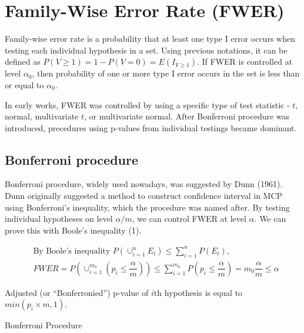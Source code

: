 \documentclass[a4paper, 11pt, oneside]{article}
\makeatletter
\def\BState{\State\hskip-\ALG@thistlm}
\makeatother
\begin{document}
\section{Family-Wise Error Rate (FWER)}
Family-wise error rate is a probability that at least one type I error occurs when testing each individual hypothesis in a set. Using previous notations, it can be defined as $P(V \geq 1) = 1 - P(V=0) = E(I_{V \geq 1})$. If FWER is controlled at level $\alpha_0$, then probability of one or more type I error occurs in the set is less than or equal to $\alpha_0$. \par
    In early works, FWER was controlled by using a specific type of test statistic - $t$, normal, multivariate $t$, or multivariate normal. After Bonferroni procedure was introduced, precedures using p-values from individual testings became dominant.

\subsection{Bonferroni procedure}
Bonferroni procedure, widely used nowadays, was suggested by Dunn (1961). Dunn originally suggested a method to construct confidence interval in MCP using Bonferroni's inequality, which the procedure was named after. By testing individual hypotheses on level $\alpha/m$, we can control FWER at level $\alpha$. We can prove this with Boole's inequality (1).

\begin{equation}
\begin{aligned}\label{proof-bonf}
&\text{By Boole's inequality }P(\cup_{i=1}^{n}E_i)\leq\sum_{i=1}^n P(E_i),\\
& FWER=P(\cup_{i=1}^{m_0}(p_i\leq\dfrac{\alpha}{m}))\leq\sum_{i=1}^{m_0}P(p_i\leq\dfrac{\alpha}{m})=m_0\dfrac{\alpha}m\leq\alpha
\end{aligned}
\end{equation}

Adjusted (or \enquote{Bonferronied}) p-value of $i$th hypothesis is equal to $min(p_i \times m, 1)$.

\begin{algorithm}
\caption{Bonferroni Procedure}\label{bonf}
\end{algorithm}
\end{document}
